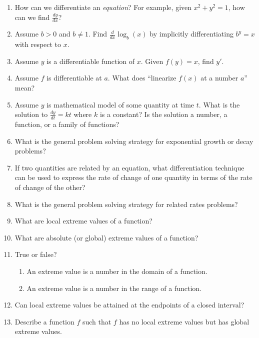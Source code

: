 \documentclass[../main.tex]{subfiles}
\begin{document}
\begin{enumerate}[label=\thesection.\arabic*, align=left]
  \item How can we differentiate an \emph{equation}? For example, given \(x^{2} + y^{2} = 1\), how can we find \(\frac{dy}{dx}\)?

  \item Assume \(b > 0\) and \(b \ne 1\). Find \(\frac{d}{dx} \log_{b}(x)\) by implicitly differentiating \(b^{y} = x\) with respect to \(x\).

  \item Assume \(y\) is a differentiable function of \(x\). Given \(f(y) = x\), find \(y'\).

  \item Assume \(f\) is differentiable at \(a\). What does ``linearize \(f(x)\) at a number \(a\)'' mean?

  \item Assume \(y\) is mathematical model of some quantity at time \(t\). What is the solution to \(\frac{dy}{dt} = kt\) where \(k\) is a constant? Is the solution a number, a function, or a family of functions?

  \item What is the general problem solving strategy for exponential growth or decay problems?

  \item If two quantities are related by an equation, what differentiation technique can be used to express the rate of change of one quantity in terms of the rate of change of the other?

  \item What is the general problem solving strategy for related rates problems?

  \item What are local extreme values of a function?

  \item What are absolute (or global) extreme values of a function?

  \item True or false? 
    \begin{enumerate}
    \item An extreme value is a number in the domain of a function.
    \item An extreme value is a number in the range of a function.
    \end{enumerate}

  \item Can local extreme values be attained at the endpoints of a closed interval?

  \item Describe a function \(f\) such that \(f\) has no local extreme values but has global extreme values.


\end{enumerate}
\end{document}
